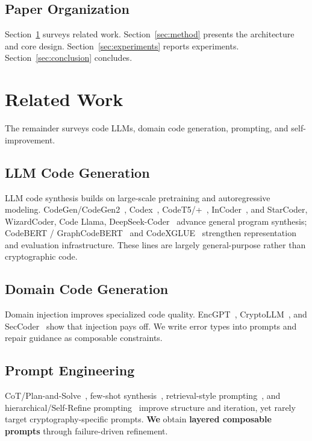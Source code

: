 \documentclass[runningheads]{llncs}
\begin{document}
\subsection{Paper Organization}
Section~\ref{sec:related} surveys related work. Section~\ref{sec:method} presents the architecture and core design. Section~\ref{sec:experiments} reports experiments. Section~\ref{sec:conclusion} concludes.

\section{Related Work}
\label{sec:related}
The remainder surveys code LLMs, domain code generation, prompting, and self-improvement.

\subsection{LLM Code Generation}
LLM code synthesis builds on large-scale pretraining and autoregressive modeling. CodeGen/CodeGen2~\cite{codegen1,codegen2}, Codex~\cite{codex}, CodeT5/+~\cite{codet5,codet5plus}, InCoder~\cite{incoder}, and StarCoder, WizardCoder, Code Llama, DeepSeek-Coder~\cite{starcoder,wizardcoder,codellama,deepseekcoder} advance general program synthesis; CodeBERT / GraphCodeBERT~\cite{codebert,graphcodebert} and CodeXGLUE~\cite{codexglue} strengthen representation and evaluation infrastructure. These lines are largely general-purpose rather than cryptographic code.

\subsection{Domain Code Generation}
Domain injection improves specialized code quality. EncGPT~\cite{encgpt}, CryptoLLM~\cite{cryptollm}, and SecCoder~\cite{seccoder} show that injection pays off. We write error types into prompts and repair guidance as composable constraints.

\subsection{Prompt Engineering}
CoT/Plan-and-Solve~\cite{cot,zeroshotcot,planandsolve}, few-shot synthesis~\cite{fewshot,progsynprompt}, retrieval-style prompting~\cite{coderagbench,repolevelprompt}, and hierarchical/Self-Refine prompting~\cite{hierprompt,selfrefine} improve structure and iteration, yet rarely target cryptography-specific prompts. \textbf{We} obtain \textbf{layered composable prompts} through failure-driven refinement.
\end{document}
